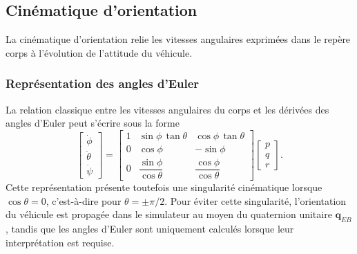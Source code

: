 \documentclass[11pt,a4paper,oneside]{report}
\begin{document}
	\subsection{Cinématique d'orientation}
	La cinématique d'orientation relie les vitesses angulaires exprimées dans le repère corps à l'évolution de l'attitude du véhicule.
	
	\subsubsection{Représentation des angles d'Euler}
	La relation classique entre les vitesses angulaires du corps et les dérivées des angles d'Euler peut s'écrire sous la forme
	\begin{equation}
		\begin{bmatrix}
			\dot{\phi}\\
			\dot{\theta}\\
			\dot{\psi}
		\end{bmatrix}
		=
		\begin{bmatrix}
			1 & \sin\phi\,\tan\theta & \cos\phi\,\tan\theta\\
			0 & \cos\phi & -\sin\phi\\
			0 & \dfrac{\sin\phi}{\cos\theta} & \dfrac{\cos\phi}{\cos\theta}
		\end{bmatrix}
		\begin{bmatrix}
			p\\
			q\\
			r
		\end{bmatrix}.
		\label{eq_euler_kinematics}
	\end{equation}
	Cette représentation présente toutefois une singularité cinématique lorsque \(\cos\theta=0\), c'est-à-dire pour \(\theta=\pm\pi/2\). Pour éviter cette singularité, l'orientation du véhicule est propagée dans le simulateur au moyen du quaternion unitaire \(\mathbf{q}_{EB}\), tandis que les angles d'Euler sont uniquement calculés lorsque leur interprétation est requise.
	
\end{document}
